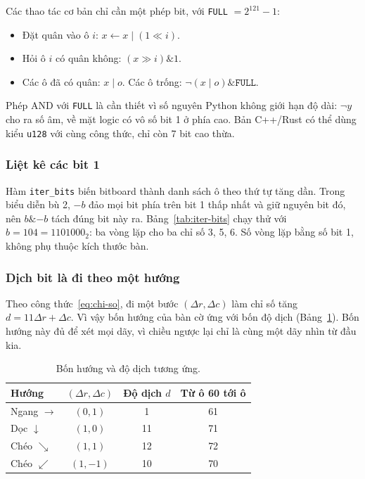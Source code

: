 \begin{table}[H]
  \centering\small
  \caption{Hai bitboard của thế cờ ở Hình~\ref{fig:chi-so}b.}
  \label{tab:bb-vi-du}
  
\end{table}

Các thao tác cơ bản chỉ cần một phép bit, với \texttt{FULL} $= 2^{121} - 1$:
\begin{itemize}
  \item Đặt quân vào ô $i$: $x \leftarrow x \mid (1 \ll i)$.
  \item Hỏi ô $i$ có quân không: $(x \gg i) \mathbin{\&} 1$.
  \item Các ô đã có quân: $x \mid o$. Các ô trống: $\lnot(x \mid o) \mathbin{\&} \texttt{FULL}$.
\end{itemize}
Phép AND với \texttt{FULL} là cần thiết vì số nguyên Python không giới hạn độ dài: $\lnot y$ cho ra số âm, về mặt logic có vô số bit 1 ở phía cao. Bản C++/Rust có thể dùng kiểu \texttt{u128} với cùng công thức, chỉ còn 7 bit cao thừa.

\subsubsection{Liệt kê các bit 1}
Hàm \texttt{iter\_bits} biến bitboard thành danh sách ô theo thứ tự tăng dần. Trong biểu diễn bù 2, $-b$ đảo mọi bit phía trên bit 1 thấp nhất và giữ nguyên bit đó, nên $b \mathbin{\&} -b$ tách đúng bit này ra. Bảng~\ref{tab:iter-bits} chạy thử với $b = 104 = 1101000_2$: ba vòng lặp cho ba chỉ số 3, 5, 6. Số vòng lặp bằng số bit 1, không phụ thuộc kích thước bàn.

\begin{table}[H]
  \centering\small
  \caption{Các bước của \texttt{iter\_bits} với $b = 104$.}
  \label{tab:iter-bits}
  
\end{table}

\subsubsection{Dịch bit là đi theo một hướng}
Theo công thức~\eqref{eq:chi-so}, đi một bước $(\Delta r, \Delta c)$ làm chỉ số tăng $d = 11\Delta r + \Delta c$. Vì vậy bốn hướng của bàn cờ ứng với bốn độ dịch (Bảng~\ref{tab:huong}). Bốn hướng này đủ để xét mọi dãy, vì chiều ngược lại chỉ là cùng một dãy nhìn từ đầu kia.

\begin{table}[H]
  \centering\small
  \caption{Bốn hướng và độ dịch tương ứng.}
  \label{tab:huong}
  \begin{tabular}{@{}lccc@{}}
    \toprule
    \textbf{Hướng} & $(\Delta r, \Delta c)$ & \textbf{Độ dịch} $d$ & \textbf{Từ ô 60 tới ô} \\
    \midrule
    Ngang $\rightarrow$ & $(0, 1)$ & 1 & 61 \\
    Dọc $\downarrow$ & $(1, 0)$ & 11 & 71 \\
    Chéo $\searrow$ & $(1, 1)$ & 12 & 72 \\
    Chéo $\swarrow$ & $(1, -1)$ & 10 & 70 \\
    \bottomrule
  \end{tabular}
\end{table}

